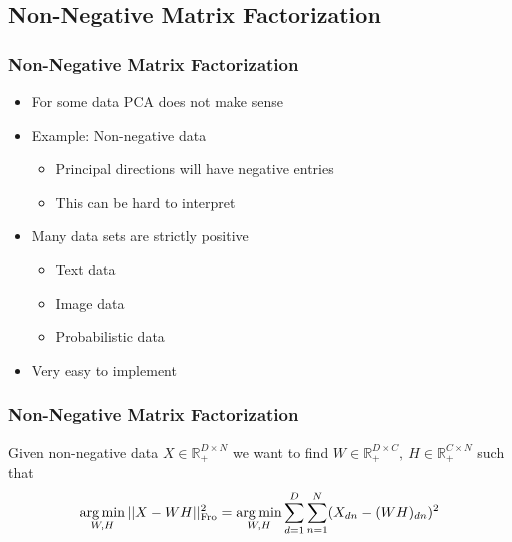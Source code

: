\documentclass[Nike]{tuberlinbeamer}
\newcommand{\R}{\ensuremath{\mathds{R}}}
\begin{document}
\subsection{Non-Negative Matrix Factorization}
\begin{frame}\frametitle{Non-Negative Matrix Factorization}
\begin{itemize}
\item For some data PCA does not make sense
\item Example: Non-negative data
\begin{itemize}
\item Principal directions will have negative entries
\item This can be hard to interpret
\end{itemize}
\item Many data sets are strictly positive
\begin{itemize}
\item Text data
\item Image data
\item Probabilistic data
\end{itemize}
\item Very easy to implement
\end{itemize}
\end{frame}

\begin{frame}\frametitle{Non-Negative Matrix Factorization}
\centering
Given non-negative data $X\in\R^{D\times N}_+$ we want to find $W\in\R_+^{D\times C},~H\in\R_+^{C\times N}$ such that\\
\begin{align} \nonumber
\operatorname*{arg\,min}_{W,H}||X-WH||_{\text{Fro}}^{2} = \operatorname*{arg\,min}_{W,H} \sum_{d = 1}^{D}  \sum_{n = 1}^{N} (X_{dn}- (WH)_{dn})^{2}  \\\nonumber
\end{align}
\end{frame}
\end{document}
